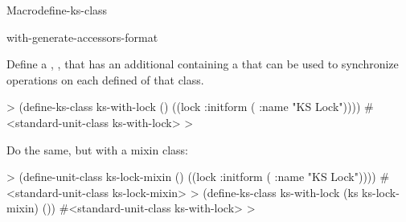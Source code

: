\documentclass[10pt,twoside,english,pdftex]{article}
\begin{document}
\begin{functiondoc}{Macro}{define-ks-class}
\classoptioninheritance

\begin{alsos}{with-generate-accessors-format}
\also[define-ks]
\end{alsos}

\fnexamples
Define a ,
, that has an additional 
containing a  that can be used to synchronize
operations on each defined  of that class.
%
\W\supp
\begin{example}
  > (define-ks-class ks-with-lock ()
      ((lock :initform ( :name "KS Lock"))))
  #<standard-unit-class ks-with-lock>
  >
\end{example}
%
Do the same, but with a mixin class:
%
\W\supp\notpretop
\begin{example}
  > (define-unit-class ks-lock-mixin ()
      ((lock :initform ( :name "KS Lock"))))
  #<standard-unit-class ks-lock-mixin>
  > (define-ks-class ks-with-lock (ks ks-lock-mixin)
      ())
  #<standard-unit-class ks-with-lock>
  >
\end{example}

\end{functiondoc}

\end{document}
